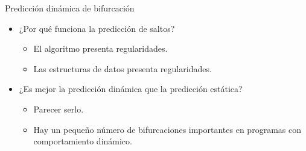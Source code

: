 \begin{frame}[t]{Predicción dinámica de bifurcación}
\begin{itemize}
  \item ¿Por qué funciona la predicción de saltos?
    \begin{itemize}
      \item El algoritmo presenta regularidades.
      \item Las estructuras de datos presenta regularidades.
    \end{itemize}

  \item ¿Es mejor la predicción dinámica que la predicción estática?
    \begin{itemize}
      \item Parecer serlo.
      \item Hay un pequeño número de bifurcaciones importantes en programas con comportamiento dinámico.
    \end{itemize}
\end{itemize}
\end{frame}
